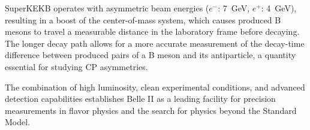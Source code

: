 SuperKEKB operates with asymmetric beam energies ($e^-$: \qty{7}{\giga\electronvolt}, $e^+$: \qty{4}{\giga\electronvolt}), resulting in a boost of the center-of-mass system, which causes produced B mesons to travel a measurable distance in the laboratory frame before decaying. The longer decay path allows for a more accurate measurement of the decay-time difference between produced pairs of a B meson and its antiparticle, a quantity essential for studying CP asymmetries.

The combination of high luminosity, clean experimental conditions, and advanced detection capabilities establishes Belle II as a leading facility for precision measurements in flavor physics and the search for physics beyond the Standard Model.